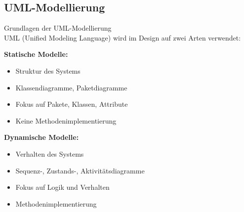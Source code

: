 \subsection{UML-Modellierung}

\begin{concept}{Grundlagen der UML-Modellierung}\\
UML (Unified Modeling Language) wird im Design auf zwei Arten verwendet:

\textbf{Statische Modelle:}
\begin{itemize}
    \item Struktur des Systems
    \item Klassendiagramme, Paketdiagramme
    \item Fokus auf Pakete, Klassen, Attribute
    \item Keine Methodenimplementierung
\end{itemize}

\textbf{Dynamische Modelle:}
\begin{itemize}
    \item Verhalten des Systems
    \item Sequenz-, Zustands-, Aktivitätsdiagramme
    \item Fokus auf Logik und Verhalten
    \item Methodenimplementierung
\end{itemize}
\end{concept}

